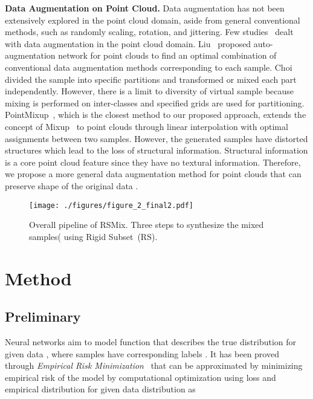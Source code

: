 \documentclass[final]{cvpr}
\begin{document}
\noindent \textbf{Data Augmentation on Point Cloud.} Data augmentation has not been extensively explored in the point cloud domain, aside from general conventional methods, such as randomly scaling, rotation, and jittering. Few studies~\cite{li2020pointaugment,choi2020part,chen2020pointmixup} dealt with data augmentation in the point cloud domain. Liu~\etal\cite{li2020pointaugment} proposed auto-augmentation network for point clouds to find an optimal combination of conventional data augmentation methods corresponding to each sample. Choi~\etal\cite{choi2020part} divided the sample into specific partitions and transformed or mixed each part independently. However, there is a limit to diversity of virtual sample because mixing is performed on inter-classes and specified grids are used for partitioning. PointMixup~\cite{chen2020pointmixup}, which is the closest method to our proposed approach, extends the concept of Mixup~\cite{zhang2017mixup} to point clouds through linear interpolation with optimal assignments between two samples. However, the generated samples have distorted structures which lead to the loss of structural information. Structural information is a core point cloud feature since they have no textural information. Therefore, we propose a more general data augmentation method for point clouds that can preserve shape of the original data .

\begin{figure*}
      \captionsetup{justification=centering}
\texttt{[image: ./figures/figure\_2\_final2.pdf]} 
\caption{Overall pipeline of RSMix. Three steps to synthesize the mixed samples( using Rigid Subset~(RS).}
      \vspace{-0.3cm}
      \label{fig:RSMix_pipeline}
   \end{figure*}


\vspace{-0.2cm}
\section{Method} \label{section:method}
\subsection{Preliminary}\label{subsection:Preliminary}
Neural networks aim to model function  that describes the true distribution  for given data , where samples  have corresponding labels . It has been proved 
through \textit{Empirical Risk Minimization}~\cite{vapnik1971uniform} that  can be approximated by minimizing empirical risk  of the model by computational optimization using loss  and empirical distribution  for given data distribution as
\vspace{-0.3cm}
\end{document}

